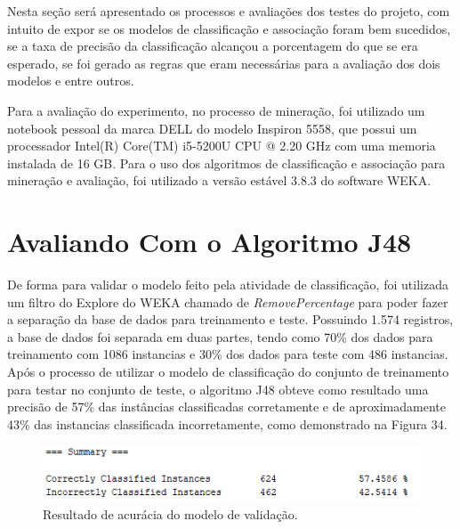 \label{chapter:Avaliacao}

\par
Nesta seção será apresentado os processos e avaliações dos testes do projeto, com intuito de expor se os modelos de classificação e associação foram bem sucedidos, se a taxa de precisão da classificação alcançou a porcentagem do que se era esperado, se foi gerado as regras que eram necessárias para a avaliação dos dois modelos e entre outros.

\par
Para a avaliação do experimento, no processo de mineração, foi utilizado um notebook pessoal da marca DELL do modelo Inspiron 5558, que possui um processador Intel(R) Core(TM) i5-5200U CPU @ 2.20 GHz com uma memoria instalada de 16 GB. Para o uso dos algoritmos de classificação e associação para mineração e avaliação, foi utilizado a versão estável 3.8.3 do software WEKA.

\section{Avaliando Com o Algoritmo J48}

\par
De forma para validar o modelo feito pela atividade de classificação, foi utilizada um filtro do Explore do WEKA chamado de \textit{RemovePercentage} para poder fazer a separação da base de dados para treinamento e teste. Possuindo 1.574 registros, a base de dados foi separada em duas partes, tendo como 70\% dos dados para treinamento com 1086 instancias e 30\% dos dados para teste com 486 instancias. Após o processo de utilizar o modelo de classificação do conjunto de treinamento para testar no conjunto de teste, o algoritmo J48 obteve como resultado uma precisão de 57\% das instâncias classificadas corretamente e de aproximadamente 43\% das instancias classificada incorretamente, como demonstrado na Figura 34.

\par
\begin{figure}[!htp]
	\begin{center}
    \caption{\label{fig:waveform_fig} Resultado de acurácia do modelo de validação.}
	\includegraphics[scale=0.99]{Figuras/Modelo_de_validacao.png}
	\end{center}
\end{figure}

